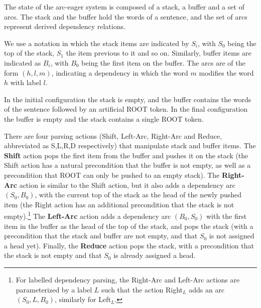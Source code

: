 \documentclass[11pt,letterpaper]{article}
\newcommand{\maybe}[1]{\textcolor{gray}{#1}}
\begin{document}
The state of the arc-eager system is composed of a
stack, a buffer and a set of arcs.
The stack and the buffer hold the words of a sentence,
and the set of arcs represent derived dependency relations.

We use a notation in which the stack items are indicated by $S_i$,
with $S_0$ being the top of the stack, $S_1$ the item previous to it
and so on.  Similarly, buffer items are indicated as $B_i$, with
$B_0$ being the first item on the buffer.  The arcs are of the form
$(h,l,m)$, indicating a dependency in which the word $m$ modifies
the word $h$ with label $l$.

In the initial configuration the stack is empty, and the buffer
contains the words of the sentence followed by an
artificial ROOT token.
In the final configuration the buffer is empty and the stack contains
a single ROOT token.

There are four parsing actions (Shift, Left-Arc, Right-Arc and Reduce,
abbreviated as S,L,R,D respectively) that
manipulate stack and buffer items.  The \textbf{Shift} action pops the
first item from the buffer and pushes it on the stack (the Shift
action has a natural precondition that the buffer is not empty, as well as a
precondition that ROOT can only be pushed to an empty stack).  The
\textbf{Right-Arc} action is similar to the Shift action, but it also adds
a dependency arc $(S_0, B_0)$,
with the current top of the stack as the head of the newly pushed item
(the Right action has an additional precondition that the stack is not
empty).\footnote{%
For labelled dependency parsing, the Right-Arc and Left-Arc actions are
parameterized by a label $L$ such that the action Right$_L$ adds an
arc $(S_0, L, B_0)$, similarly for Left$_L$.}
The \textbf{Left-Arc} action adds a dependency arc $(B_0, S_0)$ with the
first item in the buffer as the head of the top of the stack, and pops
the stack (with a precondition that the stack and buffer are not
empty, and that $S_0$ is not assigned a head yet). Finally, the
\textbf{Reduce} action pops the stack, with a precondition that the
stack is not empty and that $S_0$ is already assigned a head.
\end{document}
